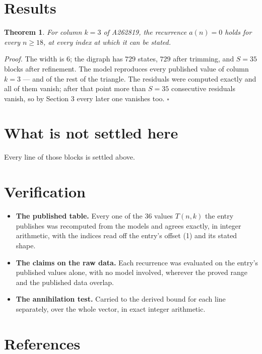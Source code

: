\documentclass[11pt]{article}
\newtheorem{theorem}{Theorem}
\theoremstyle{definition}
\begin{document}
\section{Results}

\begin{theorem} For column $k = 3$ of A262819, the recurrence $a(n) = 0$ holds for every $n \ge 18$, at every index at which it can be stated.\end{theorem}

{\itshape Proof.} The width is $6$; the digraph has $729$ states, $729$ after trimming, and $S = 35$ blocks after refinement. The model reproduces every published value of column $k = 3$ --- and of the rest of the triangle. The residuals were computed exactly and all of them vanish; after that point more than $S = 35$ consecutive residuals vanish, so by Section 3 every later one vanishes too. $\square$

\section{What is not settled here}

Every line of those blocks is settled above.

\section{Verification}

\begin{itemize}

\item {\bfseries The published table.} Every one of the 36 values $T(n,k)$ the entry publishes was recomputed from the models and agrees exactly, in integer arithmetic, with the indices read off the entry's offset (1) and its stated shape.

\item {\bfseries The claims on the raw data.} Each recurrence was evaluated on the entry's published values alone, with no model involved, wherever the proved range and the published data overlap.

\item {\bfseries The annihilation test.} Carried to the derived bound for each line separately, over the whole vector, in exact integer arithmetic.

\end{itemize}

\section{References}
\end{document}
